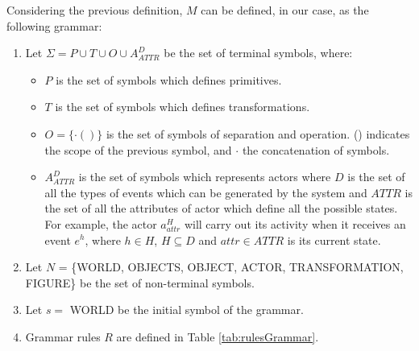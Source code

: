 \documentclass[12pt]{article}
\begin{document}
Considering the previous definition, $M$ can be defined, in our case, as the following grammar:

\begin{enumerate}
    \item Let $\Sigma = P \cup T \cup O \cup A_{ATTR}^D$ be the set of terminal symbols, where:

    \begin{itemize}
        \item $P$ is the set of symbols which defines primitives.

        \item $T$ is the set of symbols which defines transformations.

        \item $O = \{ \cdotp ( ) \}$ is the set of symbols of separation
and operation. () indicates the scope of the previous symbol, and $\cdotp$ the concatenation of
symbols.
        \item $A_{ATTR}^D$ is the set of symbols which represents actors where $D$ is the set of all the types of
        events which can be generated by the system and $ATTR$ is the set of all the attributes of actor which define
        all the possible states. For example, the actor $a_{attr}^H$ will carry out its activity when it receives an
        event $e^h$, where $h \in H$, $H \subseteq D$ and $attr \in ATTR$ is its current state.
    \end{itemize}



    \item Let $N$ = \{WORLD, OBJECTS, OBJECT, ACTOR, TRANSFORMATION,
FIGURE\} be the set of non-terminal symbols.

    \item Let $s =$ WORLD be the initial symbol of the grammar.

    \item Grammar rules $R$ are defined in Table \ref{tab:rulesGrammar}.

\end{enumerate}
\end{document}
